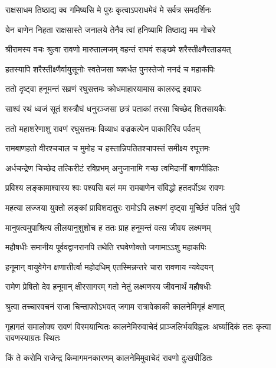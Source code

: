 \twolineshloka
{राक्षसाधम तिष्ठाद्य क्व गमिष्यसि मे पुरः}
{कृत्वाऽपराधमेवं मे सर्वत्र समदर्शिनः} %

\twolineshloka
{येन बाणेन निहता राक्षसास्ते जनालये}
{तेनैव त्वां हनिष्यामि तिष्ठाद्य मम गोचरे} %

\twolineshloka
{श्रीरामस्य वचः श्रुत्वा रावणो मारुतात्मजम्}
{वहन्तं राघवं सङ्ख्ये शरैस्तीक्ष्णैरताडयत्} %

\twolineshloka
{हतस्यापि शरैस्तीक्ष्णैर्वायुसूनोः स्वतेजसा}
{व्यवर्धत पुनस्तेजो ननर्द च महाकपिः} %

\twolineshloka
{ततो दृष्ट्वा हनूमन्तं सव्रणं रघुसत्तमः}
{क्रोधमाहारयामास कालरुद्र इवापरः} %

\twolineshloka
{साश्वं रथं ध्वजं सूतं शस्त्रौघं धनुरञ्जसा}
{छत्रं पताकां तरसा चिच्छेद शितसायकैः} %

\twolineshloka
{ततो महाशरेणाशु रावणं रघुसत्तमः}
{विव्याध वज्रकल्पेन पाकारिरिव पर्वतम्} %

\twolineshloka
{रामबाणहतो वीरश्चचाल च मुमोह च}
{हस्तान्निपतितश्चापस्तं समीक्ष्य रघूत्तमः} %

\twolineshloka
{अर्धचन्द्रेण चिच्छेद तत्किरीटं रविप्रभम्}
{अनुजानामि गच्छ त्वमिदानीं बाणपीडितः} %

\twolineshloka
{प्रविश्य लङ्कामाश्वास्य श्वः पश्यसि बलं मम}
{रामबाणेन संविद्धो हतदर्पोऽथ रावणः} %

\twolineshloka
{महत्या लज्जया युक्तो लङ्कां प्राविशदातुरः}
{रामोऽपि लक्ष्मणं दृष्ट्वा मूर्च्छितं पतितं भुवि} %

\twolineshloka
{मानुषत्वमुपाश्रित्य लीलयानुशुशोच ह}
{ततः प्राह हनूमन्तं वत्स जीवय लक्ष्मणम्} %

\twolineshloka
{महौषधीः समानीय पूर्ववद्वानरानपि}
{तथेति रघवेणोक्तो जगामाऽऽशु महाकपिः} %

\twolineshloka
{हनूमान् वायुवेगेन क्षणात्तीर्त्वा महोदधिम्}
{एतस्मिन्नन्तरे चारा रावणाय न्यवेदयन्} %

\twolineshloka
{रामेण प्रेषितो देव हनूमान् क्षीरसागरम्}
{गतो नेतुं लक्ष्मणस्य जीवनार्थं महौषधीः} %

\twolineshloka
{श्रुत्वा तच्चारवचनं राजा चिन्तापरोऽभवत्}
{जगाम रात्रावेकाकी कालनेमिगृहं क्षणात्} %

\threelineshloka
{गृहागतं समालोक्य रावणं विस्मयान्वितः}
{कालनेमिरुवाचेदं प्राञ्जलिर्भयविह्वलः}
{अर्घ्यादिकं ततः कृत्वा रावणस्याग्रतः स्थितः} %

\twolineshloka
{किं ते करोमि राजेन्द्र किमागमनकारणम्}
{कालनेमिमुवाचेदं रावणो दुःखपीडितः} %

